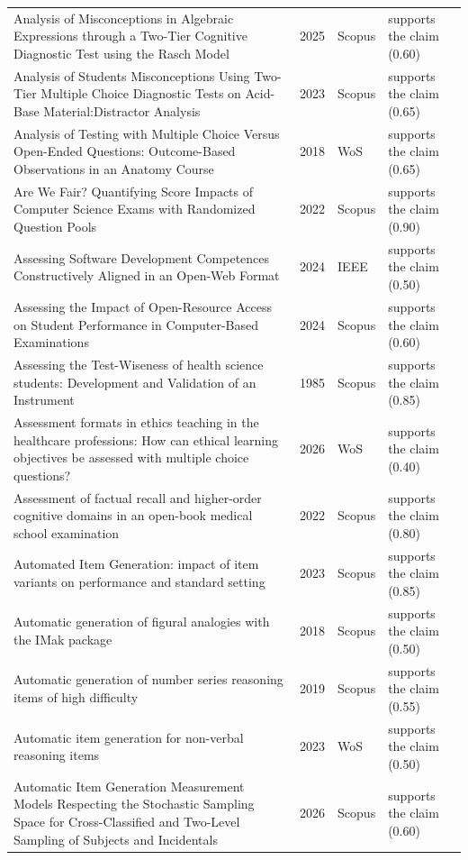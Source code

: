 \begin{longtable}{@{}%
  >{\raggedright\arraybackslash}p{}c%
  >{\raggedright\arraybackslash}p{}%
  >{\raggedright\arraybackslash}p{}@{}}
Analysis of Misconceptions in Algebraic Expressions through a Two-Tier Cognitive Diagnostic Test using the Rasch Model & 2025 & Scopus & supports the claim (0.60) \\
Analysis of Students Misconceptions Using Two-Tier Multiple Choice Diagnostic Tests on Acid-Base Material:Distractor Analysis & 2023 & Scopus & supports the claim (0.65) \\
Analysis of Testing with Multiple Choice Versus Open-Ended Questions: Outcome-Based Observations in an Anatomy Course & 2018 & WoS & supports the claim (0.65) \\
Are We Fair? Quantifying Score Impacts of Computer Science Exams with Randomized Question Pools & 2022 & Scopus & supports the claim (0.90) \\
Assessing Software Development Competences Constructively Aligned in an Open-Web Format & 2024 & IEEE & supports the claim (0.50) \\
Assessing the Impact of Open-Resource Access on Student Performance in Computer-Based Examinations & 2024 & Scopus & supports the claim (0.60) \\
Assessing the Test-Wiseness of health science students: Development and Validation of an Instrument & 1985 & Scopus & supports the claim (0.85) \\
Assessment formats in ethics teaching in the healthcare professions: How can ethical learning objectives be assessed with multiple choice questions? & 2026 & WoS & supports the claim (0.40) \\
Assessment of factual recall and higher-order cognitive domains in an open-book medical school examination & 2022 & Scopus & supports the claim (0.80) \\
Automated Item Generation: impact of item variants on performance and standard setting & 2023 & Scopus & supports the claim (0.85) \\
Automatic generation of figural analogies with the IMak package & 2018 & Scopus & supports the claim (0.50) \\
Automatic generation of number series reasoning items of high difficulty & 2019 & Scopus & supports the claim (0.55) \\
Automatic item generation for non-verbal reasoning items & 2023 & WoS & supports the claim (0.50) \\
Automatic Item Generation Measurement Models Respecting the Stochastic Sampling Space for Cross-Classified and Two-Level Sampling of Subjects and Incidentals & 2026 & Scopus & supports the claim (0.60) \\

\end{longtable}
